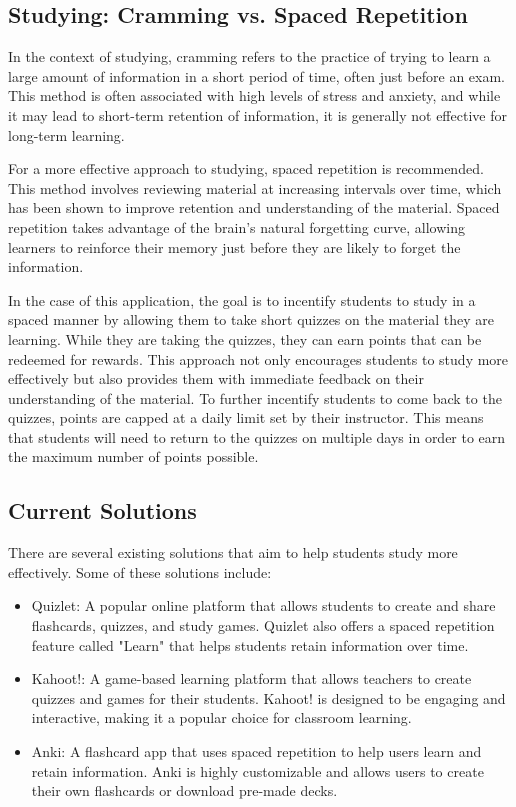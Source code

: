 \subsection{Studying: Cramming vs. Spaced Repetition}
\label{sec:cramming-vs-spaced-repetition}
In the context of studying, cramming refers to the practice of trying to learn a large amount of information in a short period of time, often just before an exam. This method is often associated with high levels of stress and anxiety, and while it may lead to short-term retention of information, it is generally not effective for long-term learning.

For a more effective approach to studying, spaced repetition is recommended. This method involves reviewing material at increasing intervals over time, which has been shown to improve retention and understanding of the material. Spaced repetition takes advantage of the brain's natural forgetting curve, allowing learners to reinforce their memory just before they are likely to forget the information.

In the case of this application, the goal is to incentify students to study in a spaced manner by allowing them to take short quizzes on the material they are learning. While they are taking the quizzes, they can earn points that can be redeemed for rewards. This approach not only encourages students to study more effectively but also provides them with immediate feedback on their understanding of the material. To further incentify students to come back to the quizzes, points are capped at a daily limit set by their instructor. This means that students will need to return to the quizzes on multiple days in order to earn the maximum number of points possible.

\subsection{Current Solutions}
\label{sec:current-solutions}

There are several existing solutions that aim to help students study more effectively. Some of these solutions include:

\begin{itemize}
  \item Quizlet: A popular online platform that allows students to create and share flashcards, quizzes, and study games. Quizlet also offers a spaced repetition feature called "Learn" that helps students retain information over time.
  \item Kahoot!: A game-based learning platform that allows teachers to create quizzes and games for their students. Kahoot! is designed to be engaging and interactive, making it a popular choice for classroom learning.
  \item Anki: A flashcard app that uses spaced repetition to help users learn and retain information. Anki is highly customizable and allows users to create their own flashcards or download pre-made decks.
\end{itemize}


